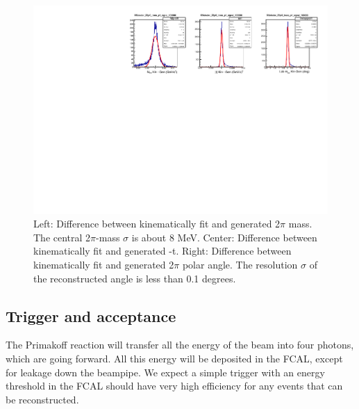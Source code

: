 \begin{figure}[tph]
\centering
\includegraphics[width=6in]{figures/Resolution_Mpipittag_signal_DSelector.pdf}
\caption{Left: Difference between kinematically fit and generated 2$\pi$ mass. The central 2$\pi$-mass $\sigma$ is about 8 MeV. Center: Difference between kinematically fit and generated -t. Right: Difference between kinematically fit and generated 2$\pi$ polar angle. The resolution $\sigma$ of the reconstructed angle is less than 0.1 degrees.
\label{fig:Resolution_Mpipittag_signal_DSelector}}
\end{figure}

\subsection{Trigger and acceptance}
The Primakoff reaction will transfer all the energy of the beam into
four photons, which are going forward. All this energy will be
deposited in the FCAL, except for leakage down the beampipe. We expect
a simple trigger with an energy threshold in the FCAL should have very
high efficiency for any events that can be reconstructed.


